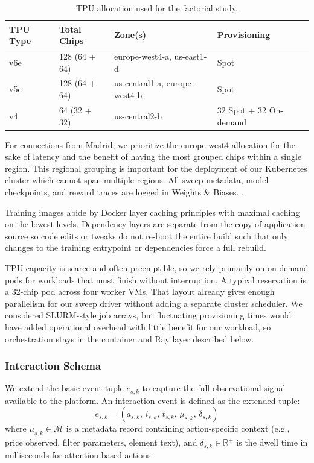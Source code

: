 \begin{table}[ht]
\centering
\caption{TPU allocation used for the factorial study.}
\label{tab:tpu_allocation}
\begin{tabular}{@{}llll@{}}
\toprule
\textbf{TPU Type} & \textbf{Total Chips} & \textbf{Zone(s)} & \textbf{Provisioning} \\
\midrule
v6e & 128 (64 + 64) & europe-west4-a, us-east1-d & Spot \\
v5e & 128 (64 + 64) & us-central1-a, europe-west4-b & Spot \\
v4 & 64 (32 + 32) & us-central2-b & 32 Spot + 32 On-demand \\
\bottomrule
\end{tabular}
\end{table}

For connections from Madrid, we prioritize the europe-west4 allocation for the sake of latency and the benefit of having the most grouped chips within a single region. This regional grouping is important for the deployment of our Kubernetes cluster which cannot span multiple regions. All sweep metadata, model checkpoints, and reward traces are logged in Weights \& Biases. \parencite{noauthor_tpu_2026,noauthor_tpu_2025-1,noauthor_tpu_2025}.


Training images abide by Docker layer caching principles with maximal caching on the lowest levels. Dependency layers are separate from the copy of application source so code edits or tweaks do not re-boot the entire build such that only changes to the training entrypoint or dependencies force a full rebuild.

TPU capacity is scarce and often preemptible, so we rely primarily on on-demand pods for workloads that must finish without interruption. A typical reservation is a 32-chip pod across four worker VMs. That layout already gives enough parallelism for our sweep driver without adding a separate cluster scheduler. We considered SLURM-style job arrays, but fluctuating provisioning times would have added operational overhead with little benefit for our workload, so orchestration stays in the container and Ray layer described below.

\subsubsection{Interaction Schema}

We extend the basic event tuple $e_{s,k}$ to capture the full observational signal available to the platform. An interaction event is defined as the extended tuple:
\begin{equation}
e_{s,k} = \left( a_{s,k}, \, i_{s,k}, \, t_{s,k}, \, \mu_{s,k}, \, \delta_{s,k} \right)
\end{equation}
where $\mu_{s,k} \in \mathcal{M}$ is a metadata record containing action-specific context (e.g., price observed, filter parameters, element text), and $\delta_{s,k} \in \mathbb{R}^+$ is the dwell time in milliseconds for attention-based actions.

